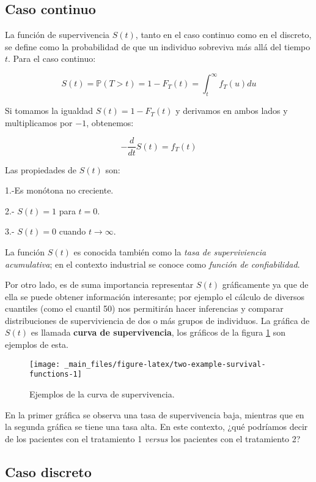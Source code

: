 \documentclass[
  a4paper,
  oneside,
  openany]{book}
\begin{document}
\hypertarget{caso-continuo}{%
\subsection*{Caso continuo}\label{caso-continuo}}


La función de supervivencia \(S(t)\), tanto en el caso continuo como en el discreto, se define como la probabilidad de que un individuo sobreviva más allá del tiempo \(t\). Para el caso continuo:

\[
S(t)=\mathbb{P}(T>t)=1-F_T(t)=\int_{t}^{\infty}f_T(u)du
\]

Si tomamos la igualdad \(S(t)=1-F_T(t)\) y derivamos en ambos lados y multiplicamos por \(-1\), obtenemos:

\[
-\frac{d}{dt}S(t)=f_T(t)
\]

Las propiedades de \(S(t)\) son:

1.-Es monótona no creciente.

2.- \(S(t)=1\) para \(t=0\).

3.- \(S(t)=0\) cuando \(t\rightarrow\infty\).

La función \(S(t)\) es conocida también como la \emph{tasa de superviviencia acumulativa}; en el contexto industrial se conoce como \emph{función de confiabilidad}.

Por otro lado, es de suma importancia representar \(S(t)\) gráficamente ya que de ella se puede obtener información interesante; por ejemplo el cálculo de diversos cuantiles (como el cuantil 50) nos permitirán hacer inferencias y comparar distribuciones de superviviencia de dos o más grupos de individuos. La gráfica de \(S(t)\) es llamada \textbf{curva de supervivencia}, los gráficos de la figura \ref{fig:two-example-survival-functions} son ejemplos de esta.

\begin{figure}

{\centering \texttt{[image: \_main\_files/figure-latex/two-example-survival-functions-1]} 

}

\caption{Ejemplos de la curva de supervivencia.}\label{fig:two-example-survival-functions}
\end{figure}

En la primer gráfica se observa una tasa de supervivencia baja, mientras que en la segunda gráfica se tiene una tasa alta. En este contexto, ¿qué podríamos decir de los pacientes con el tratamiento 1 \emph{versus} los pacientes con el tratamiento 2?

\hypertarget{caso-discreto}{%
\subsection*{Caso discreto}\label{caso-discreto}}
\end{document}
